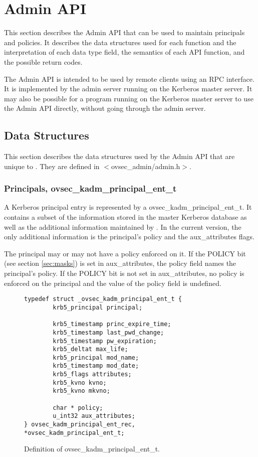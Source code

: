 \section{Admin API}

This section describes the Admin API that can be used to maintain
principals and policies.  It describes the data structures used for
each function and the interpretation of each data type field, the
semantics of each API function, and the possible return codes.

The Admin API is intended to be used by remote clients using an RPC
interface.  It is implemented by the admin server running on the
Kerberos master server.  It may also be possible for a program running
on the Kerberos master server to use the Admin API directly, without
going through the admin server.

\subsection{Data Structures}

This section describes the data structures used by the Admin API that
are unique to \secure{}.  They are defined in $<$ovsec_admin/admin.h$>$.

\subsubsection{Principals, ovsec_kadm_principal_ent_t}
\label{sec:principal-structure}

A Kerberos principal entry is represented by a
ovsec_kadm_principal_ent_t.  It contains a subset of the information
stored in the master Kerberos database as well as the additional
information maintained by \secure{}.  In the current version, the only
additional information is the principal's policy and the
aux_attributes flags.

The principal may or may not have a policy enforced on it.  If the
POLICY bit (see section \ref{sec:masks}) is set in aux_attributes, the
policy field names the principal's policy.  If the POLICY bit is not
set in aux_attributes, no policy is enforced on the principal and the
value of the policy field is undefined.

\begin{figure}[htbp]
\begin{verbatim}
typedef struct _ovsec_kadm_principal_ent_t {
        krb5_principal principal;

        krb5_timestamp princ_expire_time;
        krb5_timestamp last_pwd_change;
        krb5_timestamp pw_expiration;
        krb5_deltat max_life;
        krb5_principal mod_name;
        krb5_timestamp mod_date;
        krb5_flags attributes;
        krb5_kvno kvno;
        krb5_kvno mkvno;

        char * policy;
        u_int32 aux_attributes;
} ovsec_kadm_principal_ent_rec, *ovsec_kadm_principal_ent_t;
\end{verbatim}
\caption{Definition of ovsec_kadm_principal_ent_t.}
\label{fig:princ-t}
\end{figure}

